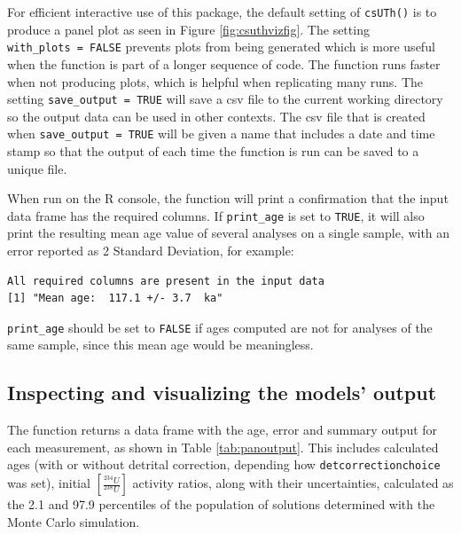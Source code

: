 \documentclass[]{elsarticle} %
\begin{document}
For efficient interactive use of this package, the default setting of \texttt{csUTh()} is to produce a panel plot as seen in Figure \ref{fig:csuthvizfig}. The setting \texttt{with\_plots\ =\ FALSE} prevents plots from being generated which is more useful when the function is part of a longer sequence of code. The function runs faster when not producing plots, which is helpful when replicating many runs. The setting \texttt{save\_output\ =\ TRUE} will save a csv file to the current working directory so the output data can be used in other contexts. The csv file that is created when \texttt{save\_output\ =\ TRUE} will be given a name that includes a date and time stamp so that the output of each time the function is run can be saved to a unique file.

When run on the R console, the function will print a confirmation that the input data frame has the required columns. If \texttt{print\_age} is set to \texttt{TRUE}, it will also print the resulting mean age value of several analyses on a single sample, with an error reported as 2 Standard Deviation, for example:

\begin{verbatim}
All required columns are present in the input data
[1] "Mean age:  117.1 +/- 3.7  ka"
\end{verbatim}

\texttt{print\_age} should be set to \texttt{FALSE} if ages computed are not for analyses of the same sample, since this mean age would be meaningless.

\hypertarget{inspecting-and-visualizing-the-models-output}{%
\subsection{Inspecting and visualizing the models' output}\label{inspecting-and-visualizing-the-models-output}}

The function returns a data frame with the age, error and summary output for each measurement, as shown in Table \ref{tab:panoutput}. This includes calculated ages (with or without detrital correction, depending how \texttt{detcorrectionchoice} was set), initial \([\frac{^{234}U}{^{238}U}]\) activity ratios, along with their uncertainties, calculated as the 2.1 and 97.9 percentiles of the population of solutions determined with the Monte Carlo simulation.
\end{document}
